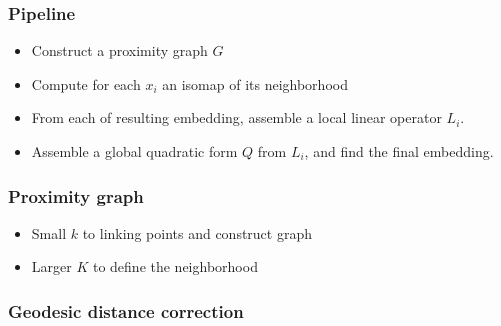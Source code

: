 \documentclass[serif,mathserif, 12pt]{beamer}
\begin{document}
\begin{frame}
  \frametitle{Pipeline}
  \begin{itemize}
  \item Construct a proximity graph $G$
  \item Compute for each $x_i$ an isomap of its neighborhood
  \item From each of resulting embedding, assemble a local linear
    operator $L_i$.
  \item Assemble a global quadratic form $Q$ from $L_i$, and
    find the final embedding.
  \end{itemize}
\end{frame}

\begin{frame}
  \frametitle{Proximity graph}
  \begin{itemize}
  \item Small $k$ to linking points and construct graph
    
  \item Larger $K$ to define the neighborhood
  \end{itemize}
\end{frame}

\begin{frame}
  \frametitle{Geodesic distance correction}
\end{frame}
\end{document}
